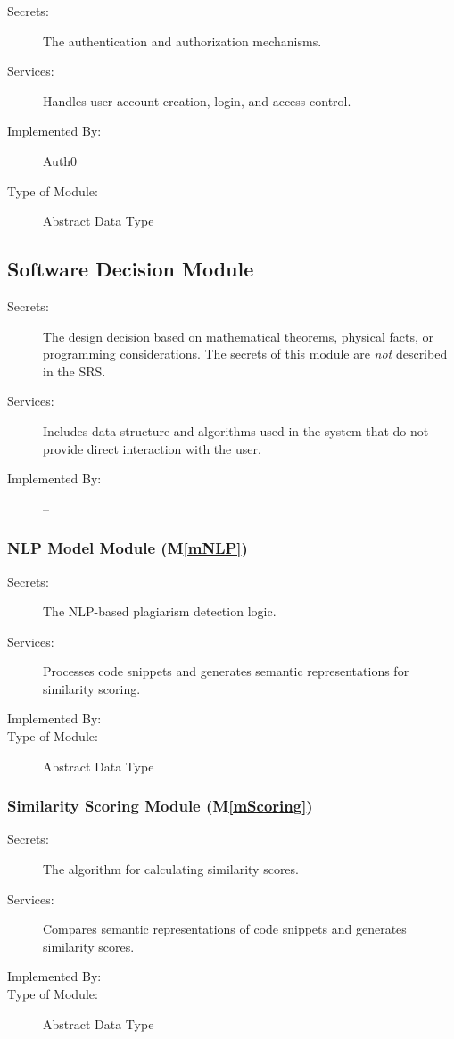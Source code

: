 \documentclass[12pt, titlepage]{article}
\newcommand{\mref}[1]{M\ref{#1}}
\begin{document}
\begin{description}
\item[Secrets:] The authentication and authorization mechanisms.
\item[Services:] Handles user account creation, login, and access control.
\item[Implemented By:] Auth0
\item[Type of Module:] Abstract Data Type
\end{description}

\subsection{Software Decision Module}

\begin{description}
\item[Secrets:] The design decision based on mathematical theorems, physical
  facts, or programming considerations. The secrets of this module are
  \emph{not} described in the SRS.
\item[Services:] Includes data structure and algorithms used in the system that
  do not provide direct interaction with the user. 
\item[Implemented By:] --
\end{description}

\subsubsection{NLP Model Module (\mref{mNLP})}

\begin{description}
\item[Secrets:] The NLP-based plagiarism detection logic.
\item[Services:] Processes code snippets and generates semantic representations for similarity scoring.
\item[Implemented By:] \progname{}
\item[Type of Module:] Abstract Data Type
\end{description}

\subsubsection{Similarity Scoring Module (\mref{mScoring})}

\begin{description}
\item[Secrets:] The algorithm for calculating similarity scores.
\item[Services:] Compares semantic representations of code snippets and generates similarity scores.
\item[Implemented By:] \progname{}
\item[Type of Module:] Abstract Data Type
\end{description}
\end{document}

